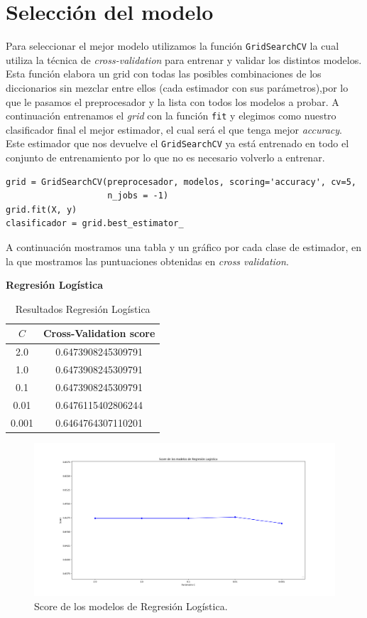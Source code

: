 \documentclass[size=a4, parskip=half, titlepage=false, toc=flat, toc=bib, 12pt]{scrartcl}
\begin{document}
\section{Selección del modelo}
Para seleccionar el mejor modelo utilizamos la función \verb|GridSearchCV| la cual utiliza la técnica de \textit{cross-validation} para entrenar y validar los distintos modelos. Esta función elabora un grid con todas las posibles combinaciones de los diccionarios sin mezclar entre ellos (cada estimador con sus parámetros),por lo que le pasamos el preprocesador y la lista con todos los modelos a probar. A continuación entrenamos el \textit{grid} con la función \verb|fit| y elegimos como nuestro clasificador final el mejor estimador, el cual será el que tenga mejor \textit{accuracy}. Este estimador que nos devuelve el \verb|GridSearchCV| ya está entrenado en todo el conjunto de entrenamiento por lo que no es necesario volverlo a entrenar.
\begin{verbatim}
grid = GridSearchCV(preprocesador, modelos, scoring='accuracy', cv=5,
                    n_jobs = -1)
grid.fit(X, y)
clasificador = grid.best_estimator_
\end{verbatim}

A continuación mostramos una tabla y un gráfico por cada clase de estimador, en la que mostramos las puntuaciones obtenidas en \textit{cross validation}.

\textbf{Regresión Logística}

\begin{table}[ht]
    \centering
    \caption{Resultados Regresión Logística}
    \label{tab:results-plapocket}
    \begin{tabular}{c | c  }
 \(C\) & Cross-Validation score \\
 \hline
 2.0   & 0.6473908245309791  \\
 1.0   & 0.6473908245309791  \\
 0.1   & 0.6473908245309791  \\
 0.01   & 0.6476115402806244 \\
 0.001  & 0.6464764307110201
    \end{tabular}
\end{table}

\begin{figure}[H]
\centering
\includegraphics[width=1\textwidth]{./img/Figure_1}
\caption{Score de los modelos de Regresión Logística.}
\end{figure}
\end{document}
